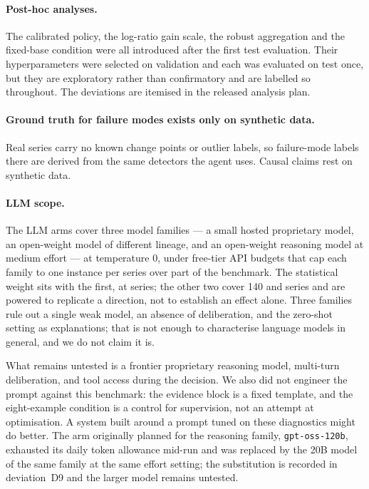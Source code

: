 \paragraph{Post-hoc analyses.}
The calibrated policy, the log-ratio gain scale, the robust aggregation and the
fixed-base condition were all introduced after the first test evaluation. Their
hyperparameters were selected on validation and each was evaluated on test once, but they
are exploratory rather than confirmatory and are labelled so throughout. The deviations
are itemised in the released analysis plan.

\paragraph{Ground truth for failure modes exists only on synthetic data.}
Real series carry no known change points or outlier labels, so failure-mode labels there
are derived from the same detectors the agent uses. Causal claims rest on synthetic data.

\paragraph{LLM scope.}
The LLM arms cover three model families --- a small hosted proprietary model, an
open-weight model of different lineage, and an open-weight reasoning model at medium
effort --- at temperature 0, under free-tier API budgets that cap each family to one
instance per series over part of the benchmark. The statistical weight sits with the
first, at \nseries{} series; the other two cover 140 and \reasonSeries{} series and are
powered to replicate a direction, not to establish an effect alone. Three families rule
out a single weak model, an absence of deliberation, and the zero-shot setting as
explanations; that is not enough to characterise language models in general, and we do not
claim it is.

What remains untested is a frontier proprietary reasoning model, multi-turn deliberation,
and tool access during the decision. We also did not engineer the prompt against this
benchmark: the evidence block is a fixed template, and the eight-example condition is a
control for supervision, not an attempt at optimisation. A system built around a prompt
tuned on these diagnostics might do better. The arm originally planned for the reasoning
family, \texttt{gpt-oss-120b}, exhausted its daily token allowance mid-run and was
replaced by the 20B model of the same family at the same effort setting; the substitution
is recorded in deviation~D9 and the larger model remains untested.

